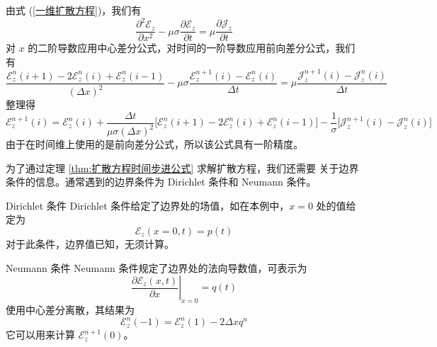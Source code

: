 \begin{solution}
    由式 (\ref{一维扩散方程})，我们有
    \begin{equation*}
        \frac{\partial^2 \mathscr{E}_z}{\partial x^2}
        -\mu \sigma \frac{\partial \mathscr{E}_z}{\partial t}
        =\mu \frac{\partial \mathscr{J}_z}{\partial t}
    \end{equation*}
    对 $x$ 的二阶导数应用中心差分公式，对时间的一阶导数应用前向差分公式，我们有
    \begin{equation*}
        \frac{\mathscr{E}_z^{n}(i+1)-2\mathscr{E}_z^n(i)+\mathscr{E}_z^{n}(i-1)}{(\Delta x)^2}
        -\mu \sigma \frac{\mathscr{E}_z^{n+1}(i)-\mathscr{E}_z^n(i)}{\Delta t}
        =\mu \frac{\mathscr{J}_z^{n+1}(i)-\mathscr{J}_z^n(i)}{\Delta t}
    \end{equation*}
    整理得
    \begin{equation*}
        \mathscr{E}_z^{n+1}(i)=\mathscr{E}_z^n(i)
        +\frac{\Delta t}{\mu \sigma (\Delta x)^2}
        \Big[\mathscr{E}_z^n(i+1)-2\mathscr{E}_z^n(i)+\mathscr{E}_z^n(i-1)\Big]
        -\frac{1}{\sigma}\Big[\mathscr{J}_z^{n+1}(i)-\mathscr{J}_z^{n}(i)\Big]
    \end{equation*}
    由于在时间维上使用的是前向差分公式，所以该公式具有一阶精度。
\end{solution}

\par 为了通过定理 \ref{thm:扩散方程时间步进公式} 求解扩散方程，我们还需要
关于边界条件的信息。通常遇到的边界条件为 Dirichlet 条件和 Neumann 条件。

\begin{theorem}{Dirichlet 条件}
    Dirichlet 条件给定了边界处的场值，如在本例中，$x=0$ 处的值给定为
    \begin{equation}
        \mathscr{E}_z(x=0,t)=p(t)
    \end{equation}
    对于此条件，边界值已知，无须计算。
\end{theorem}

\begin{theorem}{Neumann 条件}
    Neumann 条件规定了边界处的法向导数值，可表示为
    \begin{equation}
        \left.\frac{\partial \mathscr{E}_z(x,t)}{\partial x}\right|_{x=0}=q(t)
    \end{equation}
    使用中心差分离散，其结果为
    \begin{equation}
        \mathscr{E}_z^n(-1)=\mathscr{E}_z^n(1)-2\Delta x q^n
    \end{equation}
    它可以用来计算 $\mathscr{E}_z^{n+1}(0)$。
\end{theorem}

